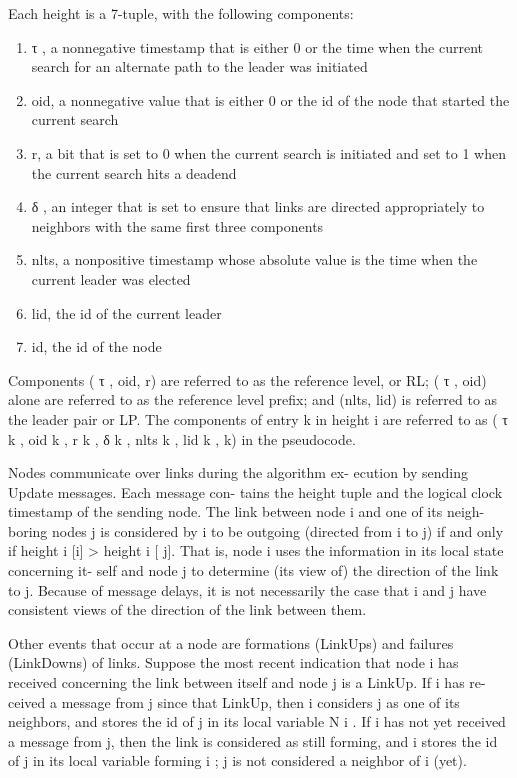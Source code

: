 \documentclass{article}
\begin{document}
Each height is a 7-tuple, with the following components:
\begin{enumerate}
\item τ , a nonnegative timestamp that is either 0 or the time when the current search for an alternate path to the leader was initiated
\item oid, a nonnegative value that is either 0 or the id of the node that started the current search
\item r, a bit that is set to 0 when the current search is initiated and set to 1 when the current search hits a deadend
\item δ , an integer that is set to ensure that links are directed appropriately to neighbors with the same first three components
\item nlts, a nonpositive timestamp whose absolute value is the time when the current leader was elected
\item lid, the id of the current leader
\item id, the id of the node
\end{enumerate}
Components ( τ , oid, r) are referred to as the reference
level, or RL; ( τ , oid) alone are referred to as the reference
level prefix; and (nlts, lid) is referred to as the leader pair
or LP. The components of entry k in height i are referred to
as ( τ k , oid k , r k , δ k , nlts k , lid k , k) in the pseudocode.

Nodes communicate over links during the algorithm ex-
ecution by sending Update messages. Each message con-
tains the height tuple and the logical clock timestamp of the
sending node. The link between node i and one of its neigh-
boring nodes j is considered by i to be outgoing (directed
from i to j) if and only if height i [i] > height i [ j]. That is,
node i uses the information in its local state concerning it-
self and node j to determine (its view of) the direction of the
link to j. Because of message delays, it is not necessarily
the case that i and j have consistent views of the direction
of the link between them.

Other events that occur at a node are formations
(LinkUps) and failures (LinkDowns) of links. Suppose the
most recent indication that node i has received concerning
the link between itself and node j is a LinkUp. If i has re-
ceived a message from j since that LinkUp, then i considers
j as one of its neighbors, and stores the id of j in its local
variable N i . If i has not yet received a message from j, then
the link is considered as still forming, and i stores the id of j
in its local variable forming i ; j is not considered a neighbor
of i (yet).
\end{document}
